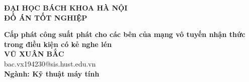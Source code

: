 \documentclass[DoAn.tex]{subfiles}
\begin{document}
\begin{titlepage}
\thispagestyle{empty}
\begin{center}

{\textbf{\large{ĐẠI HỌC BÁCH KHOA HÀ NỘI}}}\\[4cm]

{\textbf{\huge{ ĐỒ ÁN TỐT NGHIỆP}}}\\[1cm]
{\textbf{\Large{Cấp phát công suất phát cho các bên của mạng vô tuyến nhận thức trong điều kiện có kẻ nghe lén }}\\[1cm]

{\textbf{\large{VŨ XUÂN BẮC}}}\\
{\large{bac.vx194230@sis.hust.edu.vn}}\\[0.5cm]

{\textbf{\large{Ngành: Kỹ thuật máy tính }}}%

\vspace{2cm}
\begin{table}[H]
\centering
{}
\end{table}}
\end{center}



\end{titlepage}
\end{document}

